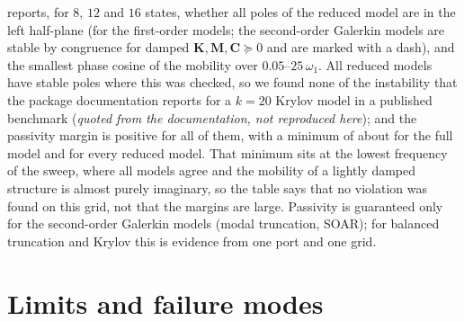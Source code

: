  reports, for $8$, $12$ and $16$ states, whether all poles of the reduced model are in the left half-plane (for the first-order models; the second-order Galerkin models are stable by congruence for damped $\bm K,\bm M,\bm C\succeq0$ and are marked with a dash), and the smallest phase cosine of the mobility over $0.05$--$25\,\omega_1$. All \cbtRowCount{} reduced models have stable poles where this was checked, so we found none of the instability that the package documentation reports for a $k=20$ Krylov model in a published benchmark (\emph{quoted from the documentation, not reproduced here}); and the passivity margin is positive for all of them, with a minimum of about \cbtPassFull for the full model and for every reduced model. That minimum sits at the lowest frequency of the sweep, where all models agree and the mobility of a lightly damped structure is almost purely imaginary, so the table says that no violation was found on this grid, not that the margins are large. Passivity is guaranteed only for the second-order Galerkin models (modal truncation, SOAR); for balanced truncation and Krylov this is evidence from one port and one grid.

\begin{table}[ht]
\centering\small

\caption{Stability and the smallest phase cosine of the mobility ($0.05$--$25\,\omega_1$) for models of $8$, $12$ and $16$ states; a dash marks second-order Galerkin models.}\label{tab:bt-stab}
\end{table}

\section{Limits and failure modes}\label{sec:bt-limits}

